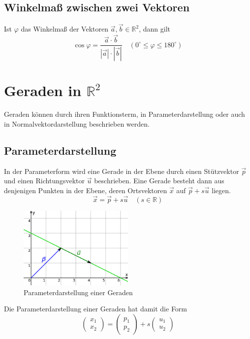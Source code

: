 \documentclass[a4paper]{article}
\begin{document}
\subsection{Winkelmaß zwischen zwei Vektoren}
Ist $\varphi$ das Winkelmaß der Vektoren $\vec a, \vec b \in \mathbb{R}^2$, dann gilt
\[
\cos \varphi = \frac{\vec a \cdot \vec b}{|\vec a|\cdot|\vec b|} \quad (0^{\circ} \leq \varphi \leq 180^{\circ})
\]

\section{Geraden in $\mathbb{R}^2$}
Geraden können durch ihren Funktionsterm, in Parameterdarstellung oder auch in Normalvektordarstellung beschrieben werden.

\subsection{Parameterdarstellung}
In der Parameterform wird eine Gerade in der Ebene durch einen Stützvektor $\vec p$ und einen Richtungsvektor $\vec u$ beschrieben. Eine Gerade besteht dann aus denjenigen Punkten in der Ebene, deren Ortsvektoren $\vec x$ auf $\vec p + s\vec u$ liegen.
\[
\vec x = \vec p + s\vec u \quad (s\in \mathbb{R})
\]
\begin{figure}[H]
\centering
\includegraphics[width=0.5\textwidth]{images/parameterdarstellung_gerade.png}
\caption{\label{fig:parameterdarstellung_gerade}Parameterdarstellung einer Geraden}
\end{figure}
Die Parameterdarstellung einer Geraden hat damit die Form
\[
\begin{pmatrix} x_1 \\ x_2 \end{pmatrix}=\begin{pmatrix} p_1 \\ p_2 \end{pmatrix} + s\begin{pmatrix} u_1 \\ u_2\end{pmatrix}
\]
\end{document}
